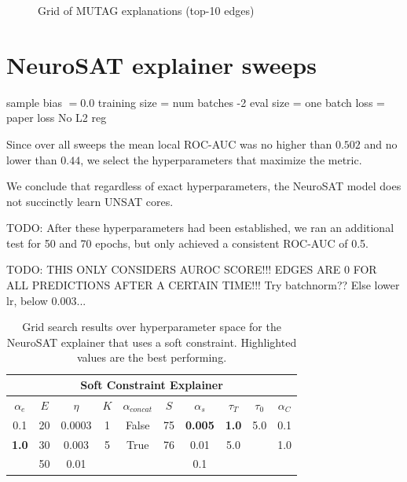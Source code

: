 \begin{figure}[htbp]
    \centering
    \caption{Grid of MUTAG explanations (top-10 edges)}
    \label{fig:grid-MUTAG-explanations}
\end{figure}

\clearpage
\section{NeuroSAT explainer sweeps}

sample bias $=0.0$
training size = num batches -2
eval size = one batch
loss = paper loss
No L2 reg

Since over all sweeps the mean local ROC-AUC was no higher than $0.502$ and no lower than $0.44$, we select the hyperparameters that maximize the metric.

We conclude that regardless of exact hyperparameters, the NeuroSAT model does not succinctly learn UNSAT cores.


TODO: After these hyperparameters had been established, we ran an additional test for 50 and 70 epochs, but only achieved a consistent ROC-AUC of 0.5.


TODO: THIS ONLY CONSIDERS AUROC SCORE!!! EDGES ARE 0 FOR ALL PREDICTIONS AFTER A CERTAIN TIME!!! Try batchnorm?? Else lower lr, below 0.003...


\begin{table}[h]
  \centering
  \scriptsize
  \begin{tabular}{|c|c|c|c|c|c|c|c|c|c|}
  \hline
  \multicolumn{10}{|c|}{\textbf{Soft Constraint Explainer}} \\ \hline
  $\alpha_e$ & $E$ & $\eta$ & $K$ & $\alpha_{concat}$ & $S$ & $\alpha_s$ & $\tau_T$ & $\tau_0$ & $\alpha_{C}$\\ \hline
  0.1 & 20 & 0.0003 & 1 & False & 75 & \textbf{0.005} & \textbf{1.0} & 5.0 & 0.1\\ 
  \textbf{1.0} & 30 & 0.003 & 5 & True & 76 & 0.01 & 5.0 &  & 1.0\\ 
   & 50 & 0.01 &  &  &  & 0.1 &  &  & \\ \hline
  \end{tabular}
  \caption[NeuroSAT soft constraint Sweep]{Grid search results over hyperparameter space for the NeuroSAT explainer that uses a soft constraint. Highlighted values are the best performing.}
\end{table}


